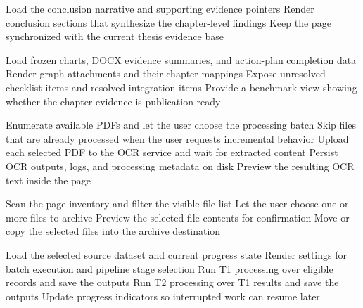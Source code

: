\begin{algorithm}[H]
Load the conclusion narrative and supporting evidence pointers\;
Render conclusion sections that synthesize the chapter-level findings\;
Keep the page synchronized with the current thesis evidence base\;
\caption{Chapter 6 Markdown Conclusion}
\label{alg:chapter6-markdown-conclusion}
\end{algorithm}

\begin{algorithm}[H]
Load frozen charts, DOCX evidence summaries, and action-plan completion data\;
Render graph attachments and their chapter mappings\;
Expose unresolved checklist items and resolved integration items\;
Provide a benchmark view showing whether the chapter evidence is publication-ready\;
\caption{Chapter 4 to Chapter 6 Benchmarks and Graph Attachments}
\label{alg:chapter4to6-benchmarks}
\end{algorithm}

\begin{algorithm}[H]
Enumerate available PDFs and let the user choose the processing batch\;
Skip files that are already processed when the user requests incremental behavior\;
Upload each selected PDF to the OCR service and wait for extracted content\;
Persist OCR outputs, logs, and processing metadata on disk\;
Preview the resulting OCR text inside the page\;
\caption{Bulk OCR Pipeline}
\label{alg:bulk-ocr}
\end{algorithm}

\begin{algorithm}[H]
Scan the page inventory and filter the visible file list\;
Let the user choose one or more files to archive\;
Preview the selected file contents for confirmation\;
Move or copy the selected files into the archive destination\;
\caption{Page Archive Mover}
\label{alg:page-archive-mover}
\end{algorithm}

\begin{algorithm}[H]
Load the selected source dataset and current progress state\;
Render settings for batch execution and pipeline stage selection\;
Run T1 processing over eligible records and save the outputs\;
Run T2 processing over T1 results and save the outputs\;
Update progress indicators so interrupted work can resume later\;
\caption{Ground Truth Resumable Pipeline}
\label{alg:ground-truth-pipeline}
\end{algorithm}

